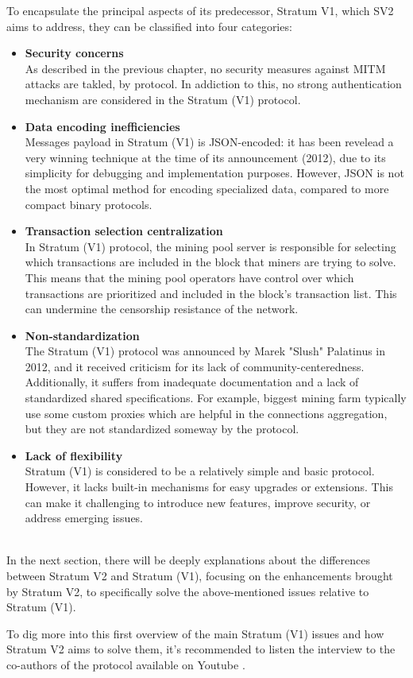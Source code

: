 \noindent To encapsulate the principal aspects of its predecessor, Stratum V1, which SV2 aims to address, they can be classified into four categories: 
\begin{itemize}
    \item \textbf{Security concerns}\\
    As described in the previous chapter, no security measures against MITM attacks are takled, by protocol. In addiction to this, no strong authentication mechanism are considered in the Stratum (V1) protocol.
    \item \textbf{Data encoding inefficiencies}\\
    Messages payload in Stratum (V1) is JSON-encoded: it has been revelead a very winning technique at the time of its announcement (2012), due to its simplicity for debugging and implementation purposes. However, JSON is not the most optimal method for encoding specialized data, compared to more compact binary protocols.
    \item \textbf{Transaction selection centralization}\\
    In Stratum (V1) protocol, the mining pool server is responsible for selecting which transactions are included in the block that miners are trying to solve. This means that the mining pool operators have control over which transactions are prioritized and included in the block's transaction list. This can undermine the censorship resistance of the network.
    \item \textbf{Non-standardization}\\
    The Stratum (V1) protocol was announced by Marek "Slush" Palatinus in 2012, and it received criticism for its lack of community-centeredness. Additionally, it suffers from inadequate documentation and a lack of standardized shared specifications. For example, biggest mining farm typically use some custom proxies which are helpful in the connections aggregation, but they are not standardized someway by the protocol.
    \item \textbf{Lack of flexibility}\\
     Stratum (V1) is considered to be a relatively simple and basic protocol. However, it lacks built-in mechanisms for easy upgrades or extensions. This can make it challenging to introduce new features, improve security, or address emerging issues.\\\\
\end{itemize}
In the next section, there will be deeply explanations about the differences between Stratum V2 and Stratum (V1), focusing on the enhancements brought by Stratum V2, to specifically solve the above-mentioned issues relative to Stratum (V1).

\noindent To dig more into this first overview of the main Stratum (V1) issues and how Stratum V2 aims to solve them, it's recommended to listen the interview to the co-authors of the protocol available on Youtube \cite{sv2video}.


